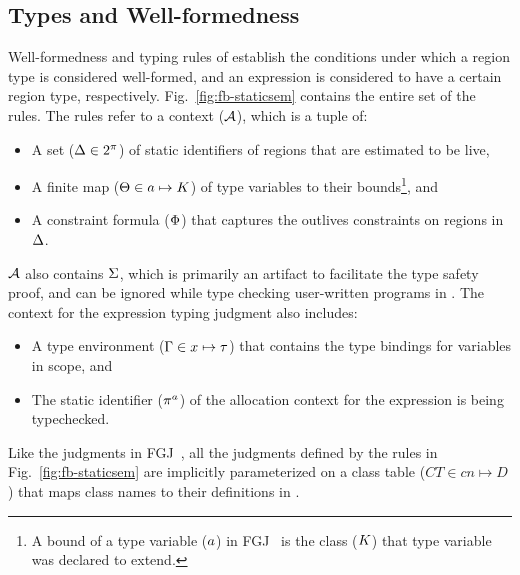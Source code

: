 \subsection{Types and Well-formedness}

Well-formedness and typing rules of \fbname establish the conditions
under which a region type is considered well-formed, and an expression
is considered to have a certain region type, respectively.
Fig.~\ref{fig:fb-staticsem} contains the entire set of the rules. The
rules refer to a context (${\mathcal{A}}$), which is a tuple of:
\begin{itemize}
\item A set ($\Delta \in 2^\pi$) of static identifiers of regions
that are estimated to be live,
\item A finite map ($\Theta \in a \mapsto K$) of type
variables to their bounds\footnote{A bound of a type variable
($a$) in FGJ~\cite{fgj} is the class ($K$) that type variable
was declared to extend.}, and
\item A constraint formula ($\Phi$) that captures the outlives
constraints on regions in $\Delta$.
\end{itemize}
${\mathcal{A}}$ also contains $\Sigma$, 
which is primarily an artifact to facilitate the type safety proof,
and can be ignored while type checking user-written programs
in \FB. The context for the expression typing judgment also includes:
\begin{itemize}
\item A type environment ($\Gamma \in x \mapsto \tau$) that contains the
type bindings for variables in scope, and 
\item The static identifier ($\pi^a$) of the allocation context for
the expression is being typechecked.  
\end{itemize}
Like the judgments in FGJ~\cite{fgj}, all the judgments defined by the
rules in Fig.~\ref{fig:fb-staticsem} are implicitly parameterized on a
class table ($CT \in cn \mapsto D$) that maps class names to their
definitions in \FB.


